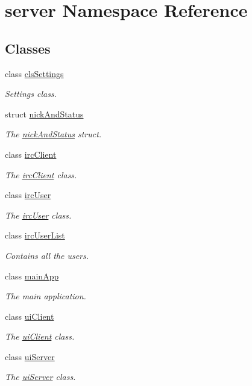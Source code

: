\hypertarget{namespaceserver}{\section{server Namespace Reference}
\label{d9/db1/namespaceserver}
}
\subsection*{Classes}
\begin{DoxyCompactItemize}
\item 
class \hyperlink{classserver_1_1cls_settings}{cls\-Settings}
\begin{DoxyCompactList}\small\item\em Settings class. \end{DoxyCompactList}\item 
struct \hyperlink{structserver_1_1nick_and_status}{nick\-And\-Status}
\begin{DoxyCompactList}\small\item\em The \hyperlink{structserver_1_1nick_and_status}{nick\-And\-Status} struct. \end{DoxyCompactList}\item 
class \hyperlink{classserver_1_1irc_client}{irc\-Client}
\begin{DoxyCompactList}\small\item\em The \hyperlink{classserver_1_1irc_client}{irc\-Client} class. \end{DoxyCompactList}\item 
class \hyperlink{classserver_1_1irc_user}{irc\-User}
\begin{DoxyCompactList}\small\item\em The \hyperlink{classserver_1_1irc_user}{irc\-User} class. \end{DoxyCompactList}\item 
class \hyperlink{classserver_1_1irc_user_list}{irc\-User\-List}
\begin{DoxyCompactList}\small\item\em Contains all the users. \end{DoxyCompactList}\item 
class \hyperlink{classserver_1_1main_app}{main\-App}
\begin{DoxyCompactList}\small\item\em The main application. \end{DoxyCompactList}\item 
class \hyperlink{classserver_1_1ui_client}{ui\-Client}
\begin{DoxyCompactList}\small\item\em The \hyperlink{classserver_1_1ui_client}{ui\-Client} class. \end{DoxyCompactList}\item 
class \hyperlink{classserver_1_1ui_server}{ui\-Server}
\begin{DoxyCompactList}\small\item\em The \hyperlink{classserver_1_1ui_server}{ui\-Server} class. \end{DoxyCompactList}\end{DoxyCompactItemize}
